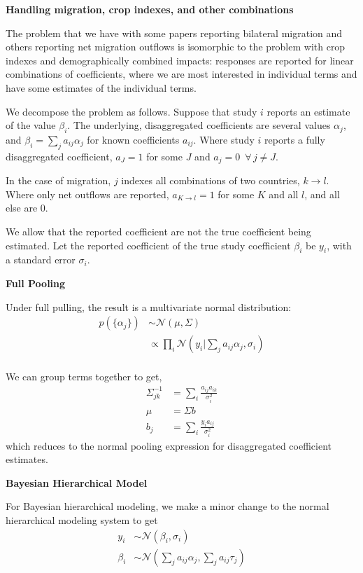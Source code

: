 \documentclass[12pt, oneside]{amsart}
\begin{document}
{\bf Handling migration, crop indexes, and other combinations}

The problem that we have with some papers reporting bilateral
migration and others reporting net migration outflows is isomorphic to
the problem with crop indexes and demographically combined impacts:
responses are reported for linear combinations of coefficients, where
we are most interested in individual terms and have some estimates of
the individual terms.

We decompose the problem as follows.  Suppose that study $i$ reports
an estimate of the value $\beta_i$.  The underlying, disaggregated
coefficients are several values $\alpha_j$, and
$\beta_i = \sum_j a_{ij} \alpha_j$ for known coefficients $a_{ij}$.
Where study $i$ reports a fully disaggregated coefficient, $a_J = 1$
for some $J$ and $a_j = 0\,\,\,\forall\, j \ne J$.

In the case of migration, $j$ indexes all combinations of two
countries, $k \rightarrow l$.  Where only net outflows are reported,
$a_{K \rightarrow l} = 1$ for some $K$ and all $l$, and all else are
0.

We allow that the reported coefficient are not the true coefficient
being estimated.  Let the reported coefficient of the true study
coefficient $\beta_i$ be $y_i$, with a standard error
$\sigma_i$.

{\bf Full Pooling}

Under full pulling, the result is a multivariate normal distribution:
\begin{align*}
  p(\{\alpha_j\}) &\sim \mathcal{N}\left(\mu, \Sigma\right) \\
                  &\propto \prod_i \mathcal{N}\left(y_i | \sum_j a_{ij}
                    \alpha_j, \sigma_i\right) \\
\end{align*}

We can group terms together to get,
\begin{align*}
  \Sigma^{-1}_{jk} &= \sum_i \frac{a_{ij} a_{ik}}{\sigma_i^2} \\
  \mu &= \Sigma b \\
  b_j &= \sum_i \frac{y_i a_{ij}}{\sigma_i^2}
\end{align*}
which reduces to the normal pooling expression for disaggregated
coefficient estimates.

{\bf Bayesian Hierarchical Model}

For Bayesian hierarchical modeling, we make a minor change to the
normal hierarchical modeling system to get
\begin{align*}
  y_i & \sim \mathcal{N}\left(\beta_i, \sigma_i\right) \\
  \beta_i & \sim \mathcal{N}\left(\sum_j a_{ij} \alpha_j, \sum_j a_{ij} \tau_j\right) \\
\end{align*}
\end{document}
